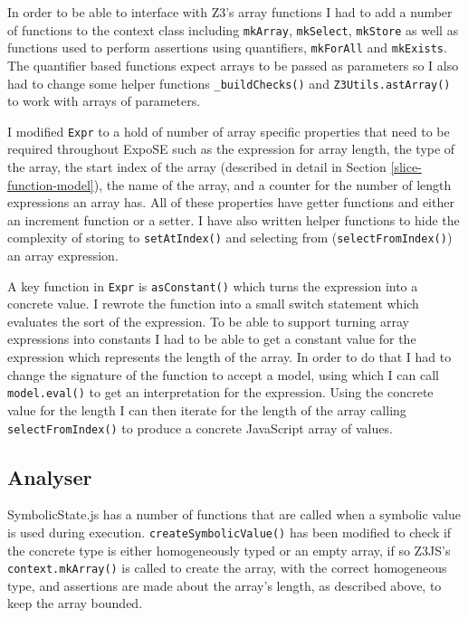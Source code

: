 \documentclass[]{final_report}
\begin{document}
In order to be able to interface with Z3’s array functions I had to add a number of functions to the context class including \lstinline|mkArray|, \lstinline|mkSelect|, \lstinline|mkStore| as well as functions used to perform assertions using quantifiers, \lstinline|mkForAll| and \lstinline|mkExists|. The quantifier based functions expect arrays to be passed as parameters so I also had to change some helper functions \lstinline|_buildChecks()| and \lstinline|Z3Utils.astArray()| to work with arrays of parameters.

I modified \lstinline|Expr| to a hold of number of array specific properties that need to be required throughout ExpoSE such as the expression for array length, the type of the array, the start index of the array (described in detail in Section \ref{slice-function-model}), the name of the array, and a counter for the number of length expressions an array has. All of these properties have getter functions and either an increment function or a setter. I have also written helper functions to hide the complexity of storing to \lstinline|setAtIndex()| and selecting from (\lstinline|selectFromIndex()|) an array expression.

A key function in \lstinline|Expr| is \lstinline|asConstant()| which turns the expression into a concrete value. I rewrote the function into a small switch statement which evaluates the sort of the expression. To be able to support turning array expressions into constants I had to be able to get a constant value for the expression which represents the length of the array. In order to do that I had to change the signature of the function to accept a model, using which I can call \lstinline|model.eval()| to get an interpretation for the expression. Using the concrete value for the length I can then iterate for the length of the array calling \lstinline|selectFromIndex()| to produce a concrete JavaScript array of values.

\subsection{Analyser}
SymbolicState.js has a number of functions that are called when a symbolic value is used during execution. \lstinline|createSymbolicValue()| has been modified to check if the concrete type is either homogeneously typed or an empty array, if so Z3JS’s \lstinline|context.mkArray()| is called to create the array, with the correct homogeneous type, and assertions are made about the array’s length, as described above, to keep the array bounded.
\end{document}
